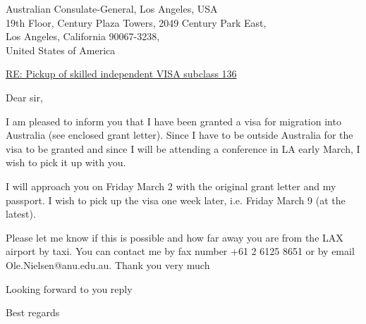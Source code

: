 \documentclass[12pt]{letter}
\begin{document}
\address{Ole M{\o}ller Nielsen     \\
         28 Scrivener Street   \\
         O'Connor, ACT 2602 \\
         Canberra \\
         Australia}


\signature{Ole M{\o}ller Nielsen}

\begin{letter}
{Australian Consulate-General, Los Angeles, USA \\
 19th Floor, Century Plaza Towers, 2049 Century Park East, \\
 Los Angeles, California 90067-3238,\\
 United States of America}

 
\opening{\underline{RE: Pickup of skilled independent VISA subclass 136}}

Dear sir,

I am pleased to inform you that I have been granted a visa for migration 
into Australia (see enclosed grant letter). 
Since I have to be outside Australia for the visa to 
be granted and since I will be attending a conference in LA early March, 
I wish to pick it up with you.

I will approach you on Friday March 2 with the original grant letter and 
my passport. I wish to pick up the visa one week later, 
i.e. Friday March 9 (at the latest).

Please let me know if this is possible and how far away you are from the 
LAX airport by taxi.
You can contact me by fax number +61 2 6125 8651
or by email Ole.Nielsen@anu.edu.au.
Thank you very much

Looking forward to you reply

\closing{Best regards}

\end{letter}
\end{document}
